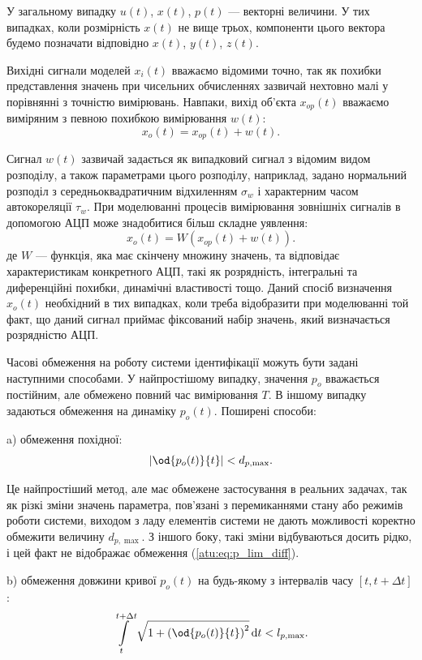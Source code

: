 У загальному випадку
$u(t)$,
$x(t)$,
$p(t)$ --- векторні величини. У тих випадках, коли розмірність
$x(t)$ не вище трьох, компоненти цього вектора будемо позначати
відповідно
$x(t) $,
$y(t) $,
$z(t) $.

Вихідні сигнали моделей \label{atu:d:x}$ x_i (t) $ вважаємо відомими точно,
так як похибки представлення значень при чисельних обчисленнях зазвичай нехтовно малі у порівнянні з
точністю вимірювань. Навпаки, вихід об'єкта
$x_{op}(t) $ вважаємо виміряним з певною похибкою вимірювання
\label{atu:d:w}
$ w (t) $:
%
\[
  x_o(t) = x_{op}(t) + w(t).
\]

Сигнал
$w(t) $ зазвичай задається як випадковий сигнал з відомим видом
розподілу, а також параметрами цього розподілу, наприклад,
задано нормальний розподіл з середньоквадратичним відхиленням
$ \sigma_w $ і характерним часом автокореляції
$ \tau_w $. При моделюванні процесів вимірювання зовнішніх сигналів
в допомогою АЦП може знадобитися більш складне уявлення:
%
\[
  x_o(t) = W( x_{op}(t) + w(t) ).
\]
%
де
$W$ --- функція, яка має скінчену множину значень, та відповідає
характеристикам конкретного АЦП, такі як розрядність,
інтегральні та диференційні похибки, динамічні властивості тощо.
Даний спосіб визначення
$ x_o (t) $ необхідний в тих випадках, коли треба відобразити при
моделюванні той факт, що даний сигнал приймає фіксований набір
значень, який визначається розрядністю АЦП.

Часові обмеження на роботу системи ідентифікації можуть бути
задані наступними способами. У найпростішому випадку, значення
$p_o$ вважається постійним, але обмежено повний час вимірювання
$T$. В іншому випадку задаються обмеження на динаміку
$p_o(t) $. Поширені способи:

a) обмеження похідної:
%
\begin{equation}
  \left| \od{p_o(t)}{t} \right| < d_{p,\max}.
  \label{atu:eq:p_lim_diff}
\end{equation}

Це найпростіший метод, але має обмежене застосування в реальних
задачах, так як різкі зміни значень параметра, пов'язані з
перемиканнями стану або режимів роботи системи, виходом з
ладу елементів системи не дають можливості коректно обмежити
величину
$ d_{p, \max} $. З іншого боку, такі зміни відбуваються досить рідко,
і цей факт не відображає обмеження (\ref{atu:eq:p_lim_diff}).

b) обмеження довжини кривої
$ p_o (t) $ на будь-якому з інтервалів часу
$ [t, t + \Delta t] $:
\begin{equation}
  \int\limits_{t}^{t+\Delta t} \sqrt{1 + \left( \od{p_o(t)}{t} \right)^2 } \, \mathrm{d}t < l_{p,\max}.
  \label{atu:eq:p_lim_l}
\end{equation}

